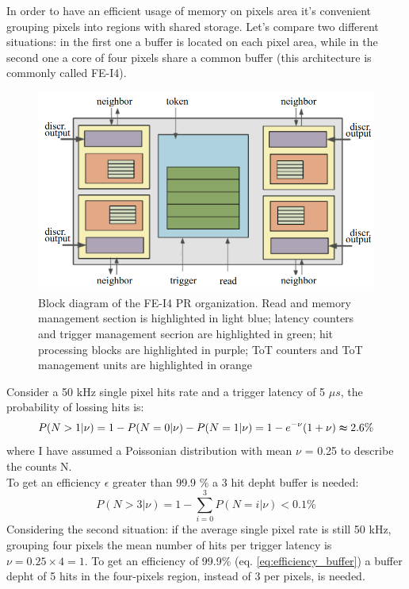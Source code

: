    In order to have an efficient usage of memory on pixels area it's convenient grouping pixels into regions with shared storage. Let's compare two different situations: in the first one a buffer is located on each pixel area, while in the second one a core of four pixels share a common buffer (this architecture is commonly called FE-I4). \\
   \begin{figure}[h!]
      \centering
      \includegraphics[width=.7\linewidth]{figures/Pixel_detectors/core.png}
      \caption{Block diagram of the FE-I4 PR organization. Read and memory
      management section is highlighted in light blue; latency counters and
      trigger management secrion are highlighted in green; hit processing blocks
      are highlighted in purple; ToT counters and ToT management units are
      highlighted in orange}
      \label{fig:core}
   \end{figure}
   Consider a 50 kHz single pixel hits rate and a trigger latency of 5 $\mu s$, the probability of lossing hits is: 
   \begin{equation}
      P(N > 1 | \nu) = 1-P(N = 0 | \nu) - P(N = 1 | \nu) = 1 - e^{-\nu} (1+\nu) \thickapprox 2.6 \% 
   \end{equation}    
   where I have assumed a Poissonian distribution with mean $\nu$ = 0.25 to describe the counts N.\\
   To get an efficiency $\epsilon$ greater than 99.9 \% a 3 hit depht buffer is needed: 
   \begin{equation}
      P(N > 3 | \nu) = 1-\sum_{i=0}^{3} P(N = i | \nu) < 0.1\%  
   \label{eq:efficiency_buffer}
   \end{equation} 
   Considering the second situation: if the average single pixel rate is still 50 kHz, grouping four pixels the mean number of hits per trigger latency is $\nu = 0.25 \times 4 = 1$. To get an efficiency of 99.9\% (eq. \ref{eq:efficiency_buffer}) a buffer depht of 5 hits in the four-pixels region, instead of 3 per pixels, is needed. 

